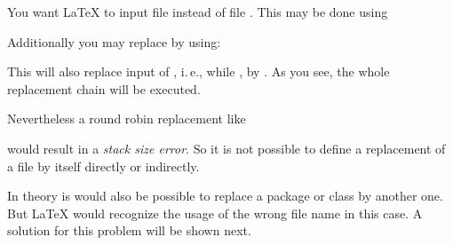 \begin{Example}
  You want \LaTeX{} to input file  instead of file
  . This may be done using
\begin{lstcode}
\end{lstcode}
  Additionally you may replace  by
   using:
\begin{lstcode}
\end{lstcode}
  This will also replace input of , i.\,e., while
  , by . As you see,
  the whole replacement chain will be executed.

  Nevertheless a round robin replacement like
\begin{lstcode}
\end{lstcode}
  would result in a \emph{stack size error}. So it is not possible to define a
  replacement of a file by itself directly or indirectly.
\end{Example}

In theory is would also be possible to replace a package or class by another
one. But \LaTeX{} would recognize the usage of the wrong file name in this
case. A solution for this problem will be shown next.%
%
\EndIndexGroup


